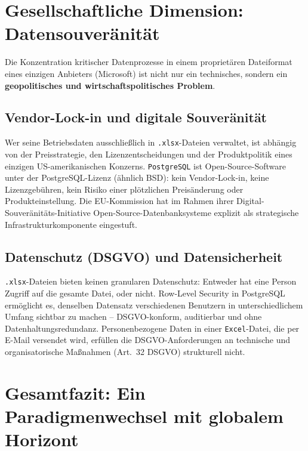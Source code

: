 \documentclass[12pt,a4paper]{report}
\theoremstyle{definition}
\theoremstyle{remark}
\newcommand{\excel}{\texttt{Excel}}
\newcommand{\pg}{\texttt{PostgreSQL}}
\newcommand{\code}[1]{\texttt{#1}}
\begin{document}
\section{Gesellschaftliche Dimension: Datensouveränität}

Die Konzentration kritischer Datenprozesse in einem proprietären
Dateiformat eines einzigen Anbieters (Microsoft) ist nicht nur ein
technisches, sondern ein \textbf{geopolitisches und
wirtschaftspolitisches Problem}.

\subsection{Vendor-Lock-in und digitale Souveränität}

Wer seine Betriebsdaten ausschließlich in \code{.xlsx}-Dateien
verwaltet, ist abhängig von der Preisstrategie, den
Lizenzentscheidungen und der Produktpolitik eines einzigen
US-amerikanischen Konzerns.
\pg{} ist Open-Source-Software unter der PostgreSQL-Lizenz
(ähnlich BSD): kein Vendor-Lock-in, keine Lizenzgebühren,
kein Risiko einer plötzlichen Preisänderung oder Produkteinstellung.
Die EU-Kommission hat im Rahmen ihrer Digital-Souveränitäts-Initiative
Open-Source-Datenbanksysteme explizit als strategische
Infrastrukturkomponente eingestuft.

\subsection{Datenschutz (DSGVO) und Datensicherheit}

\code{.xlsx}-Dateien bieten keinen granularen Datenschutz:
Entweder hat eine Person Zugriff auf die gesamte Datei, oder nicht.
Row-Level Security in PostgreSQL ermöglicht es, denselben Datensatz
verschiedenen Benutzern in unterschiedlichem Umfang sichtbar zu machen
-- DSGVO-konform, auditierbar und ohne Datenhaltungsredundanz.
Personenbezogene Daten in einer \excel-Datei, die per E-Mail versendet
wird, erfüllen die DSGVO-Anforderungen an technische und
organisatorische Maßnahmen (Art.~32 DSGVO) strukturell nicht.

\section{Gesamtfazit: Ein Paradigmenwechsel mit globalem Horizont}
\end{document}
